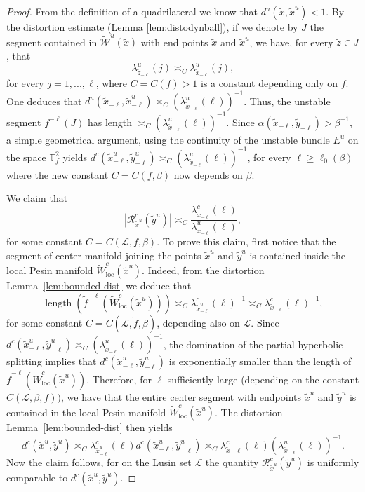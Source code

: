 \documentclass[a4paper,11pt,reqno]{amsart}
\def\tW{\widetilde W}
\newcommand{\TTf}{{\mathbb{T}_f^2}}
\newcommand{\loc}{{\operatorname{loc}}}
\newcommand{\cL}{{\mathcal L}}
\newcommand{\cW}{{\mathcal W}}
\newcommand{\cR}{{\mathcal R}}
\newcommand{\tix}{\tilde{x}}
\newcommand{\tif}{\tilde{f}}
\newcommand{\w}{\widetilde{\cW}}
\theoremstyle{definition}
\begin{document}
\begin{proof}
From the definition of a quadrilateral we know that $d^u(\tix,\tix^u)<1$. By the distortion estimate (Lemma \ref{lem:distodynball}), if we denote by $J$ the segment contained in $\w^u(\tix)$ with end points $\tix$ and $\tix^u$, we have, for every $\tilde{z}\in J$, that
\begin{equation}
    \label{eq:distunstable}
    \lambda^u_{\tilde{z}_{-\ell}}(j)\asymp_C \lambda^u_{\tilde{x}_{-\ell}}(j),
\end{equation}
for every $j=1,...,\ell$, where $C=C(f)>1$ is a constant depending only on $f$. One deduces that $d^u(\tix_{-\ell},\tix^u_{-\ell})\asymp_C\left(\lambda^u_{\tilde{x}_{-\ell}}(\ell)\right)^{-1}$. Thus, the unstable segment $f^{-\ell}(J)$ has length $\asymp_C\left(\lambda^u_{\tilde{x}_{-\ell}}(\ell)\right)^{-1}$. Since $\alpha(\tix_{-\ell},\tilde{y}_{-\ell})>\beta^{-1}$, a simple geometrical argument, using the continuity of the unstable bundle $E^u$ on the space $\TTf$ yields $d^c(\tix^u_{-\ell},\tilde{y}^u_{-\ell})\asymp_C\left(\lambda^u_{\tilde{x}_{-\ell}}(\ell)\right)^{-1}$, for every $\ell\geq\ell_0(\beta)$ where the new constant $C=C(f,\beta)$ now depends on $\beta$. 

We claim that 
\[
|\cR^c_{\tix^u}(\tilde{y}^u)|\asymp_C\frac{\lambda^c_{\tix_{-\ell}}(\ell)}{\lambda^u_{\tilde{x}_{-\ell}}(\ell)},
\]
for some constant $C=C(\cL,f,\beta)$. To prove this claim, first notice that the segment of center manifold joining the points $\tix^u$ and $\tilde{y}^u$ is contained inside the local Pesin manifold $\tW^c_{\loc}(\tix^u)$. Indeed, from the distortion Lemma~\ref{lem:bounded-dist} we deduce that 
\[
\operatorname{length}\left(\tif^{-\ell}(\tW^c_{\loc}(\tix^u))\right)\asymp_C\lambda^c_{\tix^u_{-\ell}}(\ell)^{-1}\asymp_C\lambda^c_{\tix_{-\ell}}(\ell)^{-1},
\]
for some constant $C=C(\cL,\tif,\beta)$, depending also on $\cL$. Since $d^c(\tix^u_{-\ell},\tilde{y}^u_{-\ell})\asymp_C\left(\lambda^u_{\tilde{x}_{-\ell}}(\ell)\right)^{-1}$, the domination of the partial hyperbolic splitting implies that $d^c(\tix^u_{-\ell},\tilde{y}^u_{-\ell})$ is exponentially smaller than the length of $\tif^{-\ell}(\tW^c_{\loc}(\tix^u))$. Therefore, for $\ell$ sufficiently large (depending on the constant $C(\cL,\beta,f))$, we have that the entire center segment with endpoints $\tix^u$ and $\tilde{y}^u$ is contained in the local Pesin manifold $\tW^c_{\loc}(\tix^u)$. The distortion Lemma~\ref{lem:bounded-dist} then yields
\[
d^c(\tix^u,\tilde{y}^u)\asymp_C\lambda^c_{\tix^u_{-\ell}}(\ell)d^c(\tix^u_{-\ell},\tilde{y}^u_{-\ell})\asymp_C\lambda^c_{\tix{-\ell}}(\ell)\left(\lambda^u_{\tilde{x}_{-\ell}}(\ell)\right)^{-1}.
\]
Now the claim follows, for on the Lusin set $\cL$ the quantity $\cR^c_{\tix^u}(\tilde{y}^u)$ is uniformly comparable to $d^c(\tix^u,\tilde{y}^u)$.



\end{proof}
\end{document}
